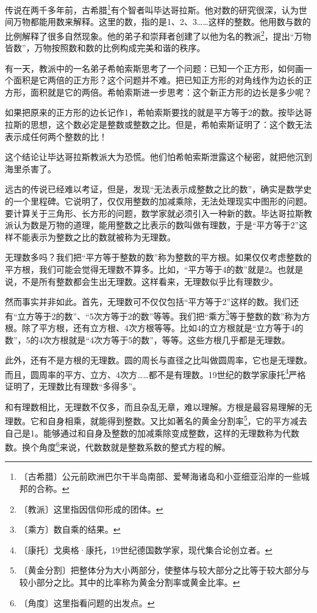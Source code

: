 \documentclass[12pt,UTF-8,openany]{ctexbook}
\begin{document}
\begin{large}
    
    传说在两千多年前，古希腊\footnote{〔古希腊〕公元前欧洲巴尔干半岛南部、爱琴海诸岛和小亚细亚沿岸的一些城邦的合称。}有个智者叫毕达哥拉斯。他对数的研究很深，认为世间万物都能用数来解释。这里的数，指的是1、2、3……这样的整数。他用数与数的比例解释了很多自然现象。他的弟子和崇拜者创建了以他为名的教派\footnote{〔教派〕这里指因信仰形成的团体。}，提出“万物皆数”，万物按照数和数的比例构成完美和谐的秩序。
    
    有一天，教派中的一名弟子希帕索斯思考了一个问题：已知一个正方形，如何画一个面积是它两倍的正方形？这个问题并不难。把已知正方形的对角线作为边长的正方形，面积就是它的两倍。希帕索斯进一步思考：这个新正方形的边长是多少呢？
    
    如果把原来的正方形的边长记作1，希帕索斯要找的就是平方等于2的数。按毕达哥拉斯的思想，这个数必定是整数或整数之比。但是，希帕索斯证明了：这个数无法表示成任何两个整数的比！
    
    这个结论让毕达哥拉斯教派大为恐慌。他们怕希帕索斯泄露这个秘密，就把他沉到海里杀害了。
    
    远古的传说已经难以考证，但是，发现“无法表示成整数之比的数”，确实是数学史的一个里程碑。它说明了，仅仅用整数的加减乘除，无法处理现实中图形的问题。要计算关于三角形、长方形的问题，数学家就必须引入一种新的数。毕达哥拉斯教派认为数是万物的道理，能用整数之比表示的数叫做有理数，于是“平方等于2”这样不能表示为整数之比的数就被称为无理数。
    
    无理数多吗？我们把“平方等于整数的数”称为整数的平方根。如果仅仅考虑整数的平方根，我们可能会觉得无理数不算多。比如，“平方等于4的数”就是2。也就是说，不是所有整数都会生出无理数。这样看来，无理数似乎比有理数少。
    
    然而事实并非如此。首先，无理数可不仅仅包括“平方等于2”这样的数。我们还有“立方等于2的数”、“5次方等于2的数”等等。我们把“乘方\footnote{〔乘方〕数自乘的结果。}等于整数的数”称为方根。除了平方根，还有立方根、4次方根等等。比如4的立方根就是“立方等于4的数”，5的4次方根就是“4次方等于5的数”，等等。这些方根几乎都是无理数。
    
    此外，还有不是方根的无理数。圆的周长与直径之比叫做圆周率，它也是无理数。而且，圆周率的平方、立方、4次方……都不是有理数。19世纪的数学家康托\footnote{〔康托〕戈奥格·康托，19世纪德国数学家，现代集合论创立者。}严格证明了，无理数比有理数“多得多”。
    
    和有理数相比，无理数不仅多，而且杂乱无章，难以理解。方根是最容易理解的无理数。它和自身相乘，就能得到整数。又比如著名的黄金分割率\footnote{〔黄金分割〕把整体分为大小两部分，使整体与较大部分之比等于较大部分与较小部分之比。其中的比率称为黄金分割率或黄金比率。}，它的平方减去自己是1。能够通过和自身及整数的加减乘除变成整数，这样的无理数称为代数数。换个角度\footnote{〔角度〕这里指看问题的出发点。}来说，代数数就是整数系数的整式方程的解。
    

\end{large}
\end{document}
